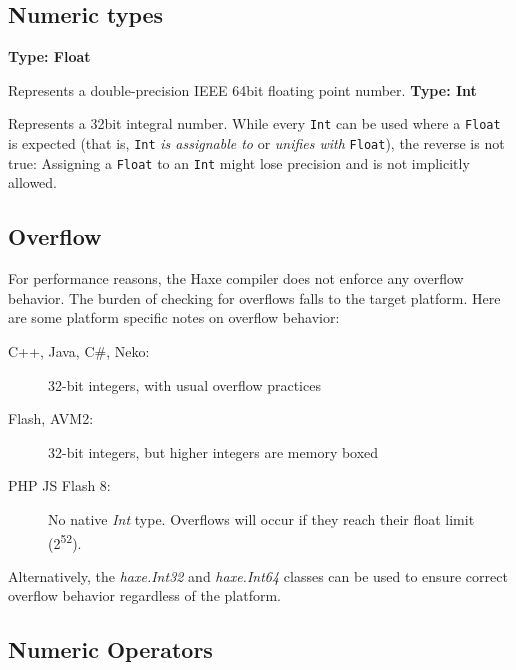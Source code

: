 \documentclass[a4paper,oneside]{book}
\newcommand{\type}[1]{\texttt{#1}}
\newenvironment{myshaded}
  {\def\FrameCommand{\fboxsep=\topsep\colorbox{bgcolor}}%
  \MakeFramed {\advance\hsize-\width \FrameRestore}}%
 {\endMakeFramed}
\newcommand{\define}[3][Definition]
	{\begin{myshaded}\noindent\textbf{#1: #2}\par\nobreak\noindent\ignorespaces#3\label{def:#2}\end{myshaded}}
\begin{document}
\subsection{Numeric types}
\label{types-numeric-types}

\define[Type]{Float}{Represents a double-precision IEEE 64bit floating point number.}
\define[Type]{Int}{Represents a 32bit integral number.}
While every \type{Int} can be used where a \type{Float} is expected (that is, \type{Int} \emph{is assignable to} or \emph{unifies with} \type{Float}), the reverse is not true: Assigning a \type{Float} to an \type{Int} might lose precision and is not implicitly allowed.

\subsection{Overflow}
\label{types-overflow}

For performance reasons, the Haxe compiler does not enforce any overflow behavior.  The burden of checking for overflows falls to the target platform. Here are some platform specific notes on overflow behavior:

\begin{description}
 \item[C++, Java, C\#, Neko:] 32-bit integers, with usual overflow practices 
 \item[Flash, AVM2:] 32-bit integers, but higher integers are memory boxed
 \item[PHP JS Flash 8:] No native \emph{Int} type.  Overflows will occur if they reach their float limit (2\textsuperscript{52}).
\end{description}

Alternatively, the \emph{haxe.Int32} and \emph{haxe.Int64} classes can be used to ensure correct overflow behavior regardless of the platform.  

\subsection{Numeric Operators}
\label{types-numeric-operators}
\end{document}
